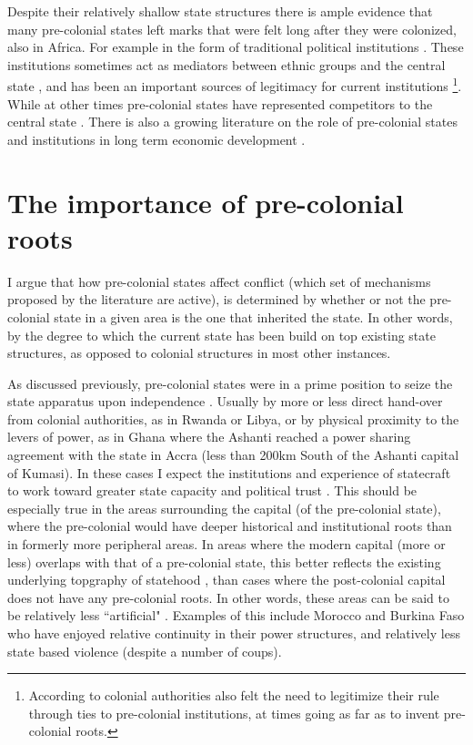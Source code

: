 \documentclass[12pt]{article}
\begin{document}
Despite their relatively shallow state structures there is ample evidence that
many pre-colonial states left marks that were felt long after they were
colonized, also in Africa. For example in the form of traditional political
institutions \citep{Beall_2005, Holzinger_2020, Neupert_Wentz_2021, Ubink_2008}.
These institutions sometimes act as mediators between ethnic groups and the
central state \citep{boone2014property, Englebert2002}, and has been an
important sources of legitimacy for current institutions
\citep{Wig2016}\footnote{According to \citet{mamdani2018citizen} colonial
	authorities also felt the need to legitimize their rule through ties to
	pre-colonial institutions, at times going as far as to invent
pre-colonial roots.}. While at other times pre-colonial states have represented
competitors to the central state \citep{Herbst2014}. There is also a growing
literature on the role of pre-colonial states and institutions in long term
economic development \citep{Michalopoulos2018, Acemoglu2014, Gennaioli2007,
Bockstette2002}.

\section{The importance of pre-colonial roots}

I argue that how pre-colonial states affect conflict (which set of mechanisms
proposed by the literature are active), is determined by whether or not the
pre-colonial state in a given area is the one that inherited the state.
In other words, by the degree to which the current state has been build on top
existing state structures, as opposed to colonial structures in most other
instances. 

As discussed previously, pre-colonial states were in a prime position to seize
the state apparatus upon independence \citep{Paine2019}. Usually by more or less
direct hand-over from colonial authorities, as in Rwanda or Libya, or by
physical proximity to the levers of power, as in Ghana where the Ashanti reached
a power sharing agreement with the state in Accra (less than 200km South of the
Ashanti capital of Kumasi). In these cases I expect the institutions and
experience of statecraft to work toward greater state capacity and political
trust \citep{Depetris-Chauvin2016}. This should be especially true in the areas
surrounding the capital (of the pre-colonial state), where the pre-colonial
would have deeper historical and institutional roots than in formerly more
peripheral areas. In areas where the modern capital (more or less) overlaps with
that of a pre-colonial state, this better reflects the existing underlying
topgraphy of statehood , than cases where the post-colonial capital does not
have any pre-colonial roots. In other words, these areas can be said to be
relatively less ``artificial" \citep{Alesina2011}. Examples of this include
Morocco and Burkina Faso who have enjoyed relative continuity in their power
structures, and relatively less state based violence (despite a number of
coups). 
\end{document}
